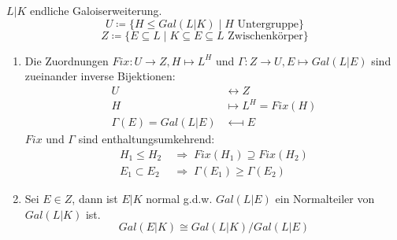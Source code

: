 \documentclass[../main.tex]{subfiles}
\begin{document}
\begin{theorem}[Hauptsatz]
    $L|K$ endliche Galoiserweiterung.
    $$U \coloneqq \{H\leq Gal(L|K) \mid H \text{ Untergruppe}\}$$
    $$Z\coloneqq \{E\subseteq L \mid K\subseteq E \subseteq L \text{ Zwischenkörper}\}$$
    \begin{enumerate}[label=\alph*)]
        \item Die Zuordnungen $Fix: U \rightarrow Z, H\mapsto L^H$ und $\Gamma: Z\rightarrow U, E \mapsto Gal(L|E)$
        sind zueinander inverse Bijektionen:
        \begin{align*}
            U &\longleftrightarrow Z\\
            H &\longmapsto L^H = Fix(H)\\
            \Gamma(E) = Gal(L|E) &\longmapsfrom  E 
        \end{align*}
        $Fix$ und $\Gamma$ sind enthaltungsumkehrend:
        \begin{align*}
            H_1\leq H_2\;&\Rightarrow\; Fix(H_1) \supseteq Fix(H_2)\\
            E_1\subset E_2\;&\Rightarrow\; \Gamma(E_1) \geq \Gamma(E_2)
        \end{align*}
        \item Sei $E \in Z$, dann ist $E|K$ normal g.d.w. $Gal(L|E)$ ein Normalteiler von $Gal(L|K)$ ist.
        $$ Gal(E|K) \cong Gal(L|K)/Gal(L|E)$$
    \end{enumerate}
\end{theorem}
\end{document}
